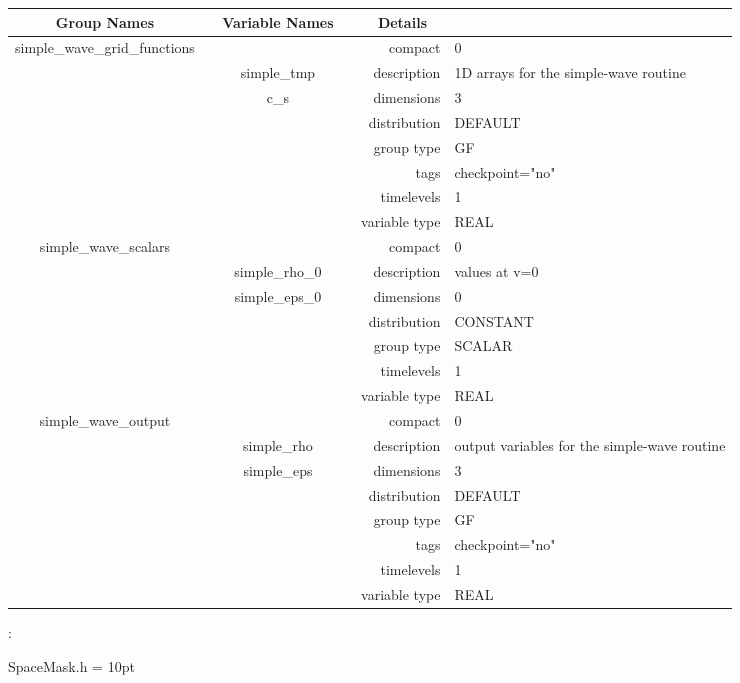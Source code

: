 \vspace{5mm}

\begin{tabular*}{150mm}{|c|c@{\extracolsep{\fill}}|rl|} \hline 
~ {\bf Group Names} ~ & ~ {\bf Variable Names} ~  &{\bf Details} ~ & ~\\ 
\hline 
simple\_wave\_grid\_functions &  & compact & 0 \\ 
 & simple\_tmp & description & 1D arrays for the simple-wave routine \\ 
 & c\_s & dimensions & 3 \\ 
 &  & distribution & DEFAULT \\ 
 &  & group type & GF \\ 
 &  & tags & checkpoint="no" \\ 
 &  & timelevels & 1 \\ 
 &  & variable type & REAL \\ 
\hline 
simple\_wave\_scalars &  & compact & 0 \\ 
 & simple\_rho\_0 & description & values at v=0 \\ 
 & simple\_eps\_0 & dimensions & 0 \\ 
 &  & distribution & CONSTANT \\ 
 &  & group type & SCALAR \\ 
 &  & timelevels & 1 \\ 
 &  & variable type & REAL \\ 
\hline 
simple\_wave\_output &  & compact & 0 \\ 
 & simple\_rho & description & output variables for the simple-wave routine \\ 
 & simple\_eps & dimensions & 3 \\ 
 &  & distribution & DEFAULT \\ 
 &  & group type & GF \\ 
 &  & tags & checkpoint="no" \\ 
 &  & timelevels & 1 \\ 
 &  & variable type & REAL \\ 
\hline 
\end{tabular*} 



\vspace{5mm}

: 

SpaceMask.h
\vspace{2mm}\parskip = 10pt 
